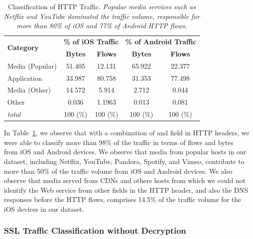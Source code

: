 \begin{table}
\centering
\begin{small}
\begin{tabular}{|p{}|c|c|c|c|}
\hline
\multirow{2}{*}{\bf Category} & \multicolumn{2}{c|}{\bf \% of iOS Traffic } &  \multicolumn{2}{c|}{\bf \% of Android Traffic } \tabularnewline
\cline{2-5}
  & {\bf Bytes}  & {\bf Flows} & {\bf Bytes} & {\bf Flows}   \tabularnewline
\hline
Media (Popular)         & 51.405  & 12.131 & 65.922 & 22.377 \tabularnewline
\hline
Application             & 33.987  & 80.758 & 31.353 & 77.498 \tabularnewline
\hline
Media (Other)           & 14.572  &  5.914 &  2.712 &  0.044 \tabularnewline
\hline
Other                   &  0.036  & 1.1963 &  0.013 &  0.081 \tabularnewline
\hline
{\em total}             & 100 (\%)& 100 (\%)& 100 (\%) & 100 (\%) \tabularnewline
\hline
\end{tabular}
\end{small}
\caption{Classification of HTTP Traffic. \emph{Popular media services such as Netflix and YouTube dominated the traffic volume, responsible for more than 80\% of iOS and 77\% of Android HTTP flows.}}
\label{tab:classify-http}
\vspace{\postfigspace}
\end{table}

In Table~\ref{tab:classify-http}, we observe that with a combination of \useragent and \httphost field in HTTP headers, we were able to classify more than 98\% of the traffic in terms of flows and bytes from iOS and Android devices.
We observe that media from popular hosts in our \mobWild dataset, including Netflix, YouTube, Pandora, Spotify, and Vimeo, contribute to more than 50\% of the traffic volume from iOS and Android devices.
We also observe that media 
served from CDNs and others hosts from which we could not identify the Web service from other fields in the HTTP header, and also the DNS responses before the HTTP flows, comprises 14.5\% of the traffic volume for the iOS devices in our dataset.

\subsubsection{SSL Traffic Classification without Decryption}

